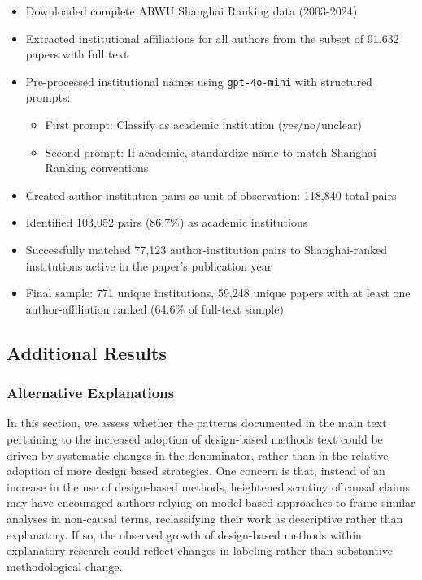 \documentclass[12pt]{article}
\begin{document}
\begin{itemize}
    \item Downloaded complete ARWU Shanghai Ranking data (2003-2024)
    \item Extracted institutional affiliations for all authors from the subset of 91,632 papers with full text
    \item Pre-processed institutional names using \texttt{gpt-4o-mini} with structured prompts:
    \begin{itemize}
        \item First prompt: Classify as academic institution (yes/no/unclear)
        \item Second prompt: If academic, standardize name to match Shanghai Ranking conventions
    \end{itemize}
    \item Created author-institution pairs as unit of observation: 118,840 total pairs
    \item Identified 103,052 pairs (86.7\%) as academic institutions
    \item Successfully matched 77,123 author-institution pairs to Shanghai-ranked institutions active in the paper's publication year
    \item Final sample: 771 unique institutions, 59,248 unique papers with at least one author-affiliation ranked (64.6\% of full-text sample)
\end{itemize}
\clearpage

\subsection{Additional Results}

\subsubsection*{Alternative Explanations}\label{sisec:altexps}

In this section, we assess whether the patterns documented in the main text pertaining to the increased adoption of design-based methods text could be driven by systematic changes in the denominator, rather than in the relative adoption of more design based strategies. One concern is that, instead of an increase in the use of design-based methods, heightened scrutiny of causal claims may have encouraged authors relying on model-based approaches to frame similar analyses in non-causal terms, reclassifying their work as descriptive rather than explanatory. If so, the observed growth of design-based methods within explanatory research could reflect changes in labeling rather than substantive methodological change.
\end{document}
